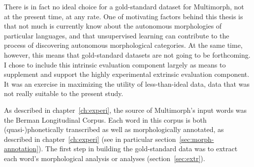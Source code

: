 There is in fact no ideal choice for a gold-standard dataset for Multimorph, 
not at the present time, at any rate. One of motivating factors behind this 
thesis is that not much is currently know about the autonomous morphologies 
of particular languages, and that unsupervised learning can contribute to the 
process of discovering autonomous morphological categories. At the same time, 
however, this means that gold-standard datasets are not going to be forthcoming. 
I chose to include this intrinsic evaluation component largely as means 
to supplement and support the highly experimental extrinsic evaluation 
component.  It was an exercise in maximizing the utility of less-than-ideal data, data that was not really
suitable to the present study.

As described in chapter~\ref{ch:experi}, the source of Multimorph's input words was the 
Berman Longitudinal Corpus. Each word in this corpus is both (quasi-)phonetically transcribed as well as morphologically annotated, as described in chapter~\ref{ch:experi} (see in particular section~\ref{sec:morph-annotation}).
The first step in 
building the gold-standard data was to extract each word's morphological analysis 
or analyses (section~\ref{sec:extr}). 

